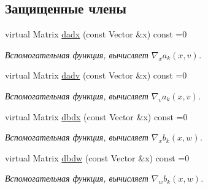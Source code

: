 \subsection*{Защищенные члены}
\begin{DoxyCompactItemize}
\item 
virtual Matrix \hyperlink{class_core_1_1_discrete_task_a4fd463183eb4a6cf8fe55d0579adae47}{dadx} (const Vector \&x) const =0\hypertarget{class_core_1_1_discrete_task_a4fd463183eb4a6cf8fe55d0579adae47}{}\label{class_core_1_1_discrete_task_a4fd463183eb4a6cf8fe55d0579adae47}

\begin{DoxyCompactList}\small\item\em Вспомогательная функция, вычисляет $\nabla_x a_k(x,v)$. \end{DoxyCompactList}\item 
virtual Matrix \hyperlink{class_core_1_1_discrete_task_adcf68e112d0f30dabe00a754a4760161}{dadv} (const Vector \&x) const =0\hypertarget{class_core_1_1_discrete_task_adcf68e112d0f30dabe00a754a4760161}{}\label{class_core_1_1_discrete_task_adcf68e112d0f30dabe00a754a4760161}

\begin{DoxyCompactList}\small\item\em Вспомогательная функция, вычисляет $\nabla_v a_k(x,v)$. \end{DoxyCompactList}\item 
virtual Matrix \hyperlink{class_core_1_1_discrete_task_ac7944bf297b9fba78e35428afa05bf89}{dbdx} (const Vector \&x) const =0\hypertarget{class_core_1_1_discrete_task_ac7944bf297b9fba78e35428afa05bf89}{}\label{class_core_1_1_discrete_task_ac7944bf297b9fba78e35428afa05bf89}

\begin{DoxyCompactList}\small\item\em Вспомогательная функция, вычисляет $\nabla_x b_k(x,w)$. \end{DoxyCompactList}\item 
virtual Matrix \hyperlink{class_core_1_1_discrete_task_a6ed33be26249cbe572b55cca7614c071}{dbdw} (const Vector \&x) const =0\hypertarget{class_core_1_1_discrete_task_a6ed33be26249cbe572b55cca7614c071}{}\label{class_core_1_1_discrete_task_a6ed33be26249cbe572b55cca7614c071}

\begin{DoxyCompactList}\small\item\em Вспомогательная функция, вычисляет $\nabla_w b_k(x,w)$. \end{DoxyCompactList}\end{DoxyCompactItemize}
